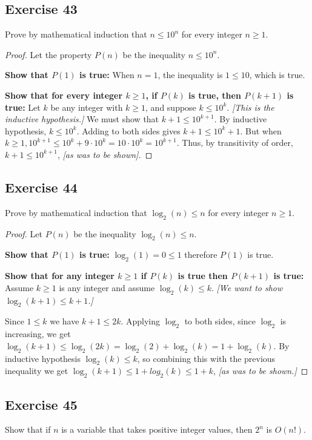 \documentclass[14pt]{extarticle}
\begin{document}
\subsection{Exercise 43}
Prove by mathematical induction that \(n \leq 10^n\) for every integer \(n \geq 1\).

\begin{proof}
    Let the property \(P(n)\) be the inequality \(n \leq 10^n\).

        {\bf Show that \(P(1)\) is true:} When \(n = 1\), the inequality is \(1 \leq 10\), which is true.

        {\bf Show that for every integer \(k \geq 1\), if \(P(k)\) is true, then \(P(k + 1)\) is true:} Let \(k\) be any integer
    with \(k \geq 1\), and suppose \(k \leq 10^k\). {\it [This is the inductive hypothesis.]} We must show that \(k + 1 \leq
    10^{k+1}\). By inductive hypothesis, \(k \leq 10^k\). Adding to both sides gives \(k + 1 \leq 10^k + 1\). But when
    \(k \geq 1, 10^{k + 1} \leq 10^k + 9 \cdot 10^k = 10 \cdot 10^k = 10^{k+1}\). Thus, by transitivity of order, \(k + 1
    \leq 10^{k+1}\), {\it [as was to be shown].}
\end{proof}

\subsection{Exercise 44}
Prove by mathematical induction that \(\log_2(n) \leq n\) for every integer \(n \geq 1\).

\begin{proof}
    Let \(P(n)\) be the inequality \(\log_2(n) \leq n\).

        {\bf Show that \(P(1)\) is true:} \(\log_2(1) = 0 \leq 1\) therefore \(P(1)\) is true.

        {\bf Show that for any integer \(k \geq 1\) if \(P(k)\) is true then \(P(k+1)\) is true:} Assume \(k \geq 1\) is any
    integer and assume \(\log_2(k) \leq k\). {\it [We want to show \(\log_2(k+1) \leq k+1\).]}

    Since \(1 \leq k\) we have \(k+1 \leq 2k\). Applying \(\log_2\) to both sides, since \(\log_2\) is increasing, we
    get \(\log_2(k+1) \leq \log_2(2k) = \log_2(2) + \log_2(k) = 1 + \log_2(k)\). By inductive hypothesis \(\log_2(k) \leq k\),
    so combining this with the previous inequality we get \(\log_2(k+1) \leq 1 + log_2(k) \leq 1+k\),
    {\it [as was to be shown.]}
\end{proof}

\subsection{Exercise 45}
Show that if \(n\) is a variable that takes positive integer values, then \(2^n\) is \(O(n!)\).
\end{document}
